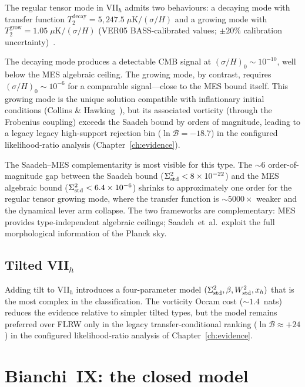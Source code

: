 The regular tensor mode in VII$_h$ admits two behaviours: a
decaying mode with transfer function
$T_2^{\mathrm{decay}} = 5{,}247.5\;\mu\mathrm{K}/(\sigma/H)$ and a growing
mode with $T_2^{\mathrm{grow}} = 1.05\;\mu\mathrm{K}/(\sigma/H)$
(VER05 BASS-calibrated values; $\pm 20\%$ calibration
uncertainty)~\cite{Saadeh2016b,Pontzen2011}.

The decaying mode produces a detectable CMB signal at
$(\sigma/H)_0 \sim 10^{-10}$, well below the MES algebraic
ceiling.  The growing mode, by contrast, requires
$(\sigma/H)_0 \sim 10^{-6}$ for a comparable signal---close
to the MES bound itself.  This growing mode is the unique
solution compatible with inflationary initial conditions
(Collins \& Hawking~\cite{CollinsHawking1973}), but its
associated vorticity (through the Frobenius coupling) exceeds
the Saadeh bound by orders of magnitude, leading to a legacy
legacy high-support rejection bin ($\ln\mathcal{B} = -18.7$) in the configured likelihood-ratio analysis
(Chapter~\ref{ch:evidence}).

The Saadeh--MES complementarity is most visible for this type.
The $\sim 6$ order-of-magnitude gap between the Saadeh bound
($\Sigma^2_{\mathrm{std}} < 8 \times 10^{-22}$) and the MES algebraic bound
($\Sigma^2_{\mathrm{std}} < 6.4 \times 10^{-6}$) shrinks to approximately one
order for the regular tensor growing mode, where the transfer
function is $\sim 5000\times$ weaker and the dynamical lever arm
collapse.  The two frameworks are complementary: MES provides
type-independent algebraic ceilings; Saadeh~et~al.\ exploit
the full morphological information of the Planck sky.


\subsection{Tilted VII$_h$}\label{sec:VIIh-tilted}

Adding tilt to VII$_h$ introduces a four-parameter model
$(\Sigma^2_{\mathrm{std}}, \beta, W^2_{\mathrm{std}}, x_h)$ that is the most complex in
the classification.  The vorticity Occam cost
($\sim 1.4$~nats) reduces the evidence relative to simpler
tilted types, but the model remains preferred over FLRW only in
the legacy transfer-conditional ranking
($\ln\mathcal{B} \approx +24$) in the configured likelihood-ratio analysis
of Chapter~\ref{ch:evidence}.


\section{Bianchi~IX: the closed model}\label{sec:BIX}

